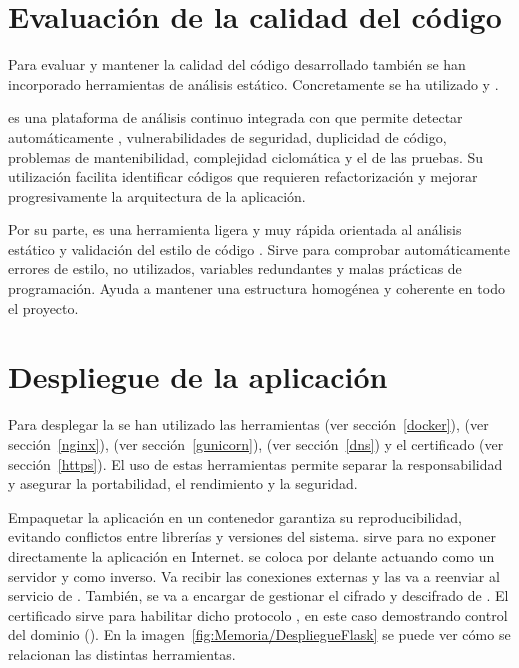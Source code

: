 \section{Evaluación de la calidad del código}

Para evaluar y mantener la calidad del código desarrollado también se han incorporado herramientas de análisis estático. Concretamente se ha utilizado  y .

 es una plataforma de análisis continuo integrada con  que permite detectar automáticamente , vulnerabilidades de seguridad, duplicidad de código, problemas de mantenibilidad, complejidad ciclomática y el  de las pruebas. Su utilización facilita identificar códigos que requieren refactorización y mejorar progresivamente la arquitectura de la aplicación. 

Por su parte,  es una herramienta ligera y muy rápida orientada al análisis estático y validación del estilo de código . Sirve para comprobar automáticamente errores de estilo,  no utilizados, variables redundantes y malas prácticas de programación. Ayuda a mantener una estructura homogénea y coherente en todo el proyecto. 

\section{Despliegue de la aplicación}
Para desplegar la  se han utilizado las herramientas  (ver sección~\ref{docker}),  (ver sección~\ref{nginx}),  (ver sección~\ref{gunicorn}),  (ver sección~\ref{dns}) y el certificado  (ver sección~\ref{https}). El uso de estas herramientas permite separar la responsabilidad y asegurar la portabilidad, el rendimiento y la seguridad. 

Empaquetar la aplicación en un contenedor  garantiza su reproducibilidad, evitando conflictos entre librerías y versiones del sistema.  sirve para no exponer directamente la aplicación  en Internet.  se coloca por delante actuando como un servidor  y como  inverso. Va recibir las conexiones externas y las va a reenviar al servicio de . También, se va a encargar de gestionar el cifrado y descifrado de . El certificado  sirve para habilitar dicho protocolo , en este caso demostrando control del dominio (). En la imagen~\ref{fig:Memoria/DespliegueFlask} se puede ver cómo se relacionan las distintas herramientas. 


